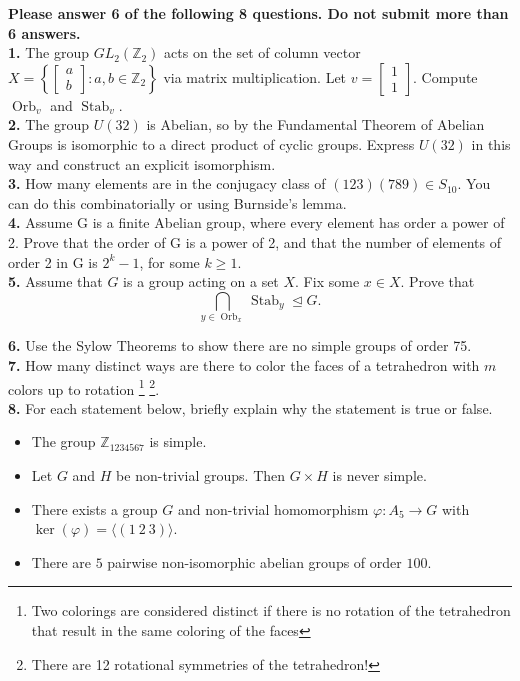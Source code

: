 \documentclass[letterpaper, 10pt]{article}
\newcommand\normal{\trianglelefteq}
\def\Orb{\operatorname{Orb}}
\def\Stab{\operatorname{Stab}}
\begin{document}
  
  \newpage


\noindent \textbf{Please answer 6 of the following 8 questions. Do not submit more than 6 answers.} \\

  
\noindent \textbf{1.} The group $GL_{2}(\mathbb{Z}_{2})$ acts on the set of column vector $X = \left\{ \begin{bmatrix}a \\ b\end{bmatrix} : a,b \in \mathbb{Z}_{2} \right\}$ via matrix multiplication. Let $v = \begin{bmatrix}1 \\ 1\end{bmatrix}$. Compute $\Orb_{v}$ and $\Stab_{v}$. \\

\noindent \textbf{2.} The group $U(32)$ is Abelian, so by the Fundamental Theorem of Abelian Groups is isomorphic to a direct product of cyclic groups. Express $U(32)$ in this way and construct an explicit isomorphism. \\

\noindent \textbf{3.} How many elements are in the conjugacy class of $(123)(789) \in S_{10}$. You can do this combinatorially or using Burnside's lemma. \\

\noindent \textbf{4.} Assume G is a finite Abelian group, where every element has order a power of 2. Prove that the order of G is a power of 2, and that the number of elements of order 2 in G is $2^{k}-1$, for some $k\geq 1$. \\

\noindent \textbf{5.} Assume that $G$ is a group acting on a set $X$. Fix some $ x\in X$. Prove that 
$$
\bigcap_{y \in \Orb_{x}} \Stab_{y} \normal G. 
$$

\noindent \textbf{6.} Use the Sylow Theorems to show there are no simple groups of order 75. \\

\noindent \textbf{7.} How many distinct ways are there to color the faces of a tetrahedron with $m$ colors up to rotation \footnote{Two colorings are considered distinct if there is no rotation of the tetrahedron that result in the same coloring of the faces} \footnote{There are 12 rotational symmetries of the tetrahedron!}.  \\

\noindent \textbf{8.} For each statement below, briefly explain why the statement is true or false.
\begin{itemize}
    \item The group $\mathbb{Z}_{1234567}$ is simple.
    \item Let $G$ and $H$ be non-trivial groups. Then $G \times H$ is never simple. 
    \item There exists a group $G$ and non-trivial homomorphism $\varphi: A_{5} \rightarrow G$ with $\ker(\varphi) = \langle (1\ 2\ 3) \rangle$. 
    \item There are $5$ pairwise non-isomorphic abelian groups of order $100$. 
\end{itemize}
\end{document}
